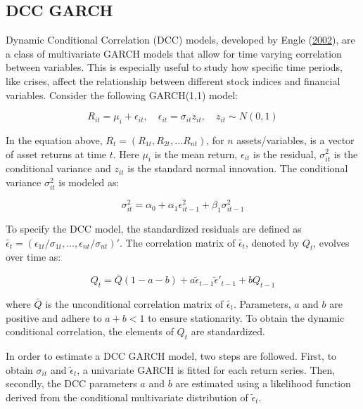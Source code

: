 \documentclass[11pt,preprint, authoryear]{elsarticle}
\numberwithin{equation}{section}
\numberwithin{figure}{section}
\numberwithin{table}{section}
\begin{document}
\hypertarget{dcc-garch}{%
\subsection{DCC GARCH}\label{dcc-garch}}

Dynamic Conditional Correlation (DCC) models, developed by Engle
(\protect\hyperlink{ref-Engle2002}{2002}), are a class of multivariate
GARCH models that allow for time varying correlation between variables.
This is especially useful to study how specific time periods, like
crises, affect the relationship between different stock indices and
financial variables. Consider the following GARCH(1,1) model:

\begin{equation}
R_{it} = \mu_i + \epsilon_{it}, \quad \epsilon_{it} = \sigma_{it}z_{it}, \quad z_{it} \sim N(0,1) \label{eq1}
\end{equation}

In the equation above, \(R_t = (R_{1t}, R_{2t}, ... R_{nt})\), for \(n\)
assets/variables, is a vector of asset returns at time \(t\). Here
\(\mu_i\) is the mean return, \(\epsilon_{it}\) is the residual,
\(\sigma_{it}^2\) is the conditional variance and \(z_{it}\) is the
standard normal innovation. The conditional variance \(\sigma_{it}^2\)
is modeled as:

\begin{equation}
\sigma_{it}^2 = \alpha_0 + \alpha_1 \epsilon_{it-1}^2 + \beta_1 \sigma_{it-1}^2 \label{eq2}
\end{equation}

To specify the DCC model, the standardized residuals are defined as
\(\tilde{\epsilon_t} = \left( \epsilon_{1t} / \sigma_{1t}, \ldots, \epsilon_{nt} / \sigma_{nt} \right)'\).
The correlation matrix of \(\tilde{\epsilon_t}\), denoted by \(Q_t\),
evolves over time as:

\begin{equation}
Q_t = \bar{Q}(1 - a - b) + a \tilde{\epsilon}_{t-1}  \tilde{\epsilon}'_{t-1} + b Q_{t-1} \label{eq3}
\end{equation}

where \(\bar{Q}\) is the unconditional correlation matrix of
\(\tilde{\epsilon_t}\). Parameters, \(a\) and \(b\) are positive and
adhere to \(a + b < 1\) to ensure stationarity. To obtain the dynamic
conditional correlation, the elements of \(Q_t\) are standardized.

In order to estimate a DCC GARCH model, two steps are followed. First,
to obtain \(\sigma_{it}\) and \(\tilde{\epsilon}_t\), a univariate GARCH
is fitted for each return series. Then, secondly, the DCC parameters
\(a\) and \(b\) are estimated using a likelihood function derived from
the conditional multivariate distribution of \(\tilde{\epsilon}_t\).
\end{document}
